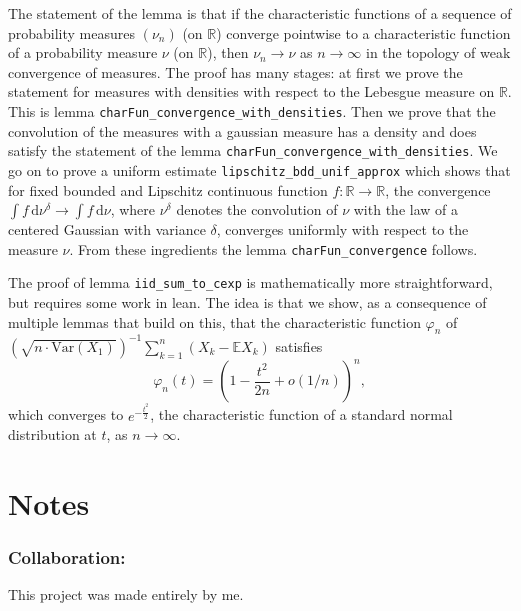 \documentclass[12pt]{article}
\begin{document}
The statement of the lemma is that if the characteristic functions of a sequence of probability measures $(\nu_n)$ (on $\mathbb{R}$) converge pointwise to a characteristic function of a probability measure $\nu$ (on $\mathbb{R}$), then $\nu_n \to \nu$ as $n\to\infty$ in the topology of weak convergence of measures. The proof has many stages: at first we prove the statement for measures with densities with respect to the Lebesgue measure on $\mathbb{R}$. This is lemma \lstinline{charFun_convergence_with_densities}. Then we prove that the convolution of the measures with a gaussian measure has a density and does satisfy the statement of the lemma \lstinline{charFun_convergence_with_densities}. We go on to prove a uniform estimate \lstinline{lipschitz_bdd_unif_approx} which shows that for fixed bounded and Lipschitz continuous function $f \colon \mathbb{R} \to \mathbb{R}$, the convergence $\int f \, \textrm{d}\nu^\delta \to \int f \, \textrm{d}\nu$, where $\nu^\delta$ denotes the convolution of $\nu$ with the law of a centered Gaussian with variance $\delta$, converges uniformly with respect to the measure $\nu$. From these ingredients the lemma \lstinline{charFun_convergence} follows.

The proof of lemma \lstinline{iid_sum_to_cexp} is mathematically more straightforward, but requires some work in lean. The idea is that we show, as a consequence of multiple lemmas that build on this, that the characteristic function $\varphi_n$ of $(\sqrt{n \cdot \textrm{Var} (X_1)})^{-1} \sum_{k=1}^n (X_k - \mathbb{E} X_k)$ satisfies
\[
\varphi_n(t) = \left(1 - \frac{t^2}{2n} + o(1/n) \right)^n,
\]
which converges to $e^{-\frac{t^2}{2}}$, the characteristic function of a standard normal distribution at $t$, as $n\to\infty$.

\section*{Notes}

\subsubsection*{Collaboration:}
This project was made entirely by me.
\end{document}
